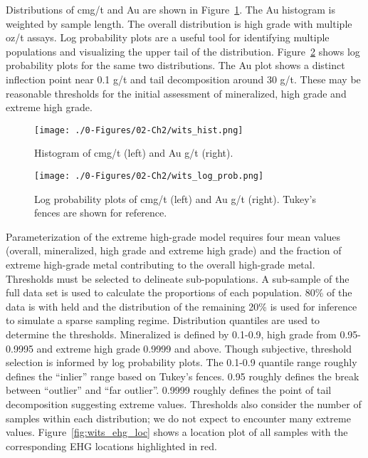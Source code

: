 Distributions of cmg/t and Au are shown in Figure~\ref{fig:wits_hist}. The Au histogram is weighted by sample length. The overall distribution is high grade with multiple oz/t assays. Log probability plots are a useful tool for identifying multiple populations and visualizing the upper tail of the distribution. Figure~\ref{fig:wits_log_prob} shows log probability plots for the same two distributions. The Au plot shows a distinct inflection point near 0.1 g/t and tail decomposition around 30 g/t. These may be reasonable thresholds for the initial assessment of mineralized, high grade and extreme high grade.

\begin{figure}[htb!]
    \centering
    \texttt{[image: ./0-Figures/02-Ch2/wits\_hist.png]}
    \caption{Histogram of cmg/t (left) and Au g/t (right).}
    \label{fig:wits_hist}
\end{figure}

\begin{figure}[htb!]
    \centering
    \texttt{[image: ./0-Figures/02-Ch2/wits\_log\_prob.png]}
    \caption{Log probability plots of cmg/t (left) and Au g/t (right). Tukey's fences are shown for reference.}
    \label{fig:wits_log_prob}
\end{figure}

Parameterization of the extreme high-grade model requires four mean values (overall, mineralized, high grade and extreme high grade) and the fraction of extreme high-grade metal contributing to the overall high-grade metal. Thresholds must be selected to delineate sub-populations. A sub-sample of the full data set is used to calculate the proportions of each population. 80\% of the data is with held and the distribution of the remaining 20\% is used for inference to simulate a sparse sampling regime. Distribution quantiles are used to determine the thresholds. Mineralized is defined by 0.1-0.9, high grade from 0.95-0.9995 and extreme high grade 0.9999 and above. Though subjective, threshold selection is informed by log probability plots. The 0.1-0.9 quantile range roughly defines the ``inlier'' range based on Tukey's fences. 0.95 roughly defines the break between ``outlier'' and ``far outlier''. 0.9999 roughly defines the point of tail decomposition suggesting extreme values. Thresholds also consider the number of samples within each distribution; we do not expect to encounter many extreme values. Figure~\ref{fig:wits_ehg_loc} shows a location plot of all samples with the corresponding EHG locations highlighted in red.


